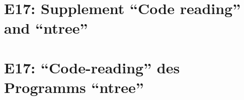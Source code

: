 
\thispagestyle{empty}
\ifenglish
\section*{E17: Supplement ``Code reading'' and ``ntree''}

\fi
\ifgerman
\section*{E17: "`Code-reading"' des Programms "`ntree"'}

\fi


